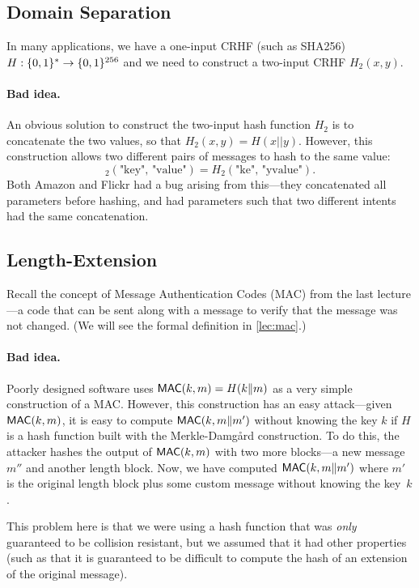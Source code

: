 \subsection{Domain Separation}
In many applications, we have a one-input CRHF (such as SHA256) $H: \{0,1\}^* \rightarrow \{0,1\}^{256}$ 
and we need to construct a two-input CRHF $H_2(x, y)$. 

\paragraph{Bad idea.} An obvious solution to construct the two-input hash function $H_2$ 
is to concatenate the two values, so that $H_2(x, y) = H(x || y)$.
However, this construction allows two different pairs of messages to hash to the same value:
\[ _2(\text{"key", "value"}) = H_2(\text{"ke", "yvalue"}).\]
Both Amazon and Flickr had a bug arising from
this---they concatenated all parameters before
hashing, and had parameters such that two
different intents had the same concatenation.\cite{flickr}

\subsection{Length-Extension}
Recall the concept of Message Authentication Codes
(MAC) from the last lecture---a code that can be
sent along with a message to verify that the message was not changed.
(We will see the formal definition in \cref{lec:mac}.)

\paragraph{Bad idea.}
Poorly designed software uses $\mathsf{MAC}(k, m) = H(k \| m)$ as a very simple construction of a MAC.
However, this construction has an easy attack---given $\mathsf{MAC}(k, m)$, it is easy to compute $\mathsf{MAC}(k, m\|m')$ 
without knowing the key $k$ if $H$ is a hash function built with the Merkle-Damg\aa{}rd construction.
To do this, the attacker hashes the output of $\mathsf{MAC}(k, m)$ with two more blocks---a new 
message $m''$ and another length block. Now, we
have computed $\mathsf{MAC}(k, m\|m')$ where $m'$ is the
original length block plus some custom message
without knowing the key~$k$. 

This problem here is that we were using a hash
function that was \emph{only} guaranteed to be
collision resistant, but we assumed that it had other
properties (such as that it is guaranteed to be
difficult to compute the hash of an extension of
the original message).

